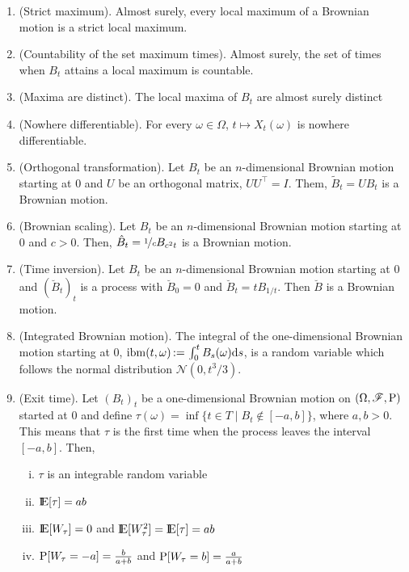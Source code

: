 \documentclass[a4paper,10pt]{scrbook}
\begin{document}
\begin{enumerate}
 \item (Strict maximum). Almost surely, every local maximum of a Brownian motion is a strict
       local maximum.
       
 \item (Countability of the set maximum times). Almost surely, the set of times when $B_t$ attains
       a local maximum is countable.
       
 \item (Maxima are distinct). The local maxima of $B_t$ are almost surely distinct
 
 \item (Nowhere differentiable). For every \(\omega\in\Omega\), \(t\mapsto X_t(\omega)\) is 
        nowhere differentiable.
 \item (Orthogonal transformation). Let \(B_t\) be an \(n\)-dimensional Brownian motion starting at \(0\) and 
       \(U\) be an orthogonal matrix, \(UU^{\top} = I\). Them,
       \(\tilde{B}_t = UB_t\) is a Brownian motion.
 \item (Brownian scaling).   Let \(B_t\) be an \(n\)-dimensional Brownian motion starting at \(0\) and \(c>0\).
       Then, \(\hat{B}_t = \nicefrac{1}{c}B_{c^2 t}\) is a Brownian motion.       
 \item (Time inversion). Let \(B_t\) be an \(n\)-dimensional Brownian motion starting at \(0\) and 
       \((\breve{B}_t)_t\) is a process with \(\breve{B}_0 = 0\) and \(\breve{B}_t = t B_{1/t}\).
       Then \(\breve{B}\) is a Brownian motion.
 \item (\hypertarget{link:ibm}{Integrated Brownian motion}). 
        The integral of the one-dimensional Brownian motion starting at \(0\), 
        \(\mathrm{ibm}(t, \omega) {}{}\mathop{\mathrel{:}=}{}{} \int_0^t B_s(\omega) \mathrm{d} s\), is a random variable 
       which follows the normal distribution \(\mathcal{N}(0, t^3/3)\).
 \item (Exit time). Let \((B_t)_t\) be a one-dimensional Brownian motion on \((\Omega,\mathscr{F},\mathrm{P})\) 
	started at \(0\) and define \(\tau(\omega) = \inf \{t\in T {}\mid{} 
	B_t \notin [-a, b]\}\), where \(a,b > 0\).
	This means that \(\tau\) is the first time when the process leaves 
	the interval \([-a, b]\).
	Then, 
	\begin{enumerate}[i.]
	 \item \(\tau\) is an integrable random variable
	 \item \(\E[\tau] = ab\)
	 \item \(\E[W_{\tau}] = 0\) and \(\E[W_{\tau}^2] = \E[\tau] = ab\)
	 \item \(\mathrm{P}[W_\tau = -a] = \frac{b}{a+b}\) and \(\mathrm{P}[W_\tau = b] = \frac{a}{a+b}\)
	\end{enumerate}
\end{enumerate}
\end{document}
